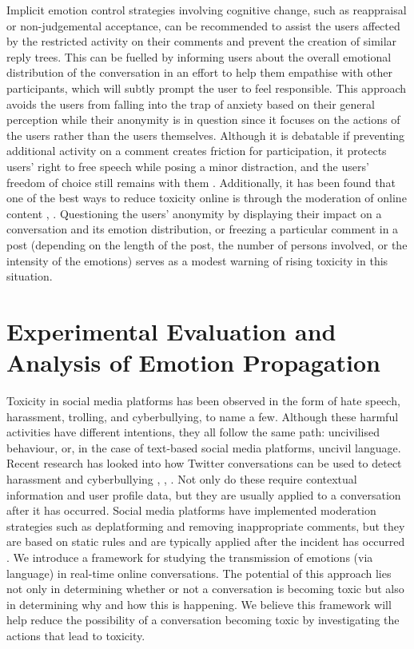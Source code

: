 \documentclass[acmtog]{acmart}
\begin{document}
Implicit emotion control strategies involving cognitive change, such as reappraisal or non-judgemental acceptance, can be recommended to assist the users affected by the restricted activity on their comments and prevent the creation of similar reply trees. This can be fuelled by informing users about the overall emotional distribution of the conversation in an effort to help them empathise with other participants, which will subtly prompt the user to feel responsible. This approach avoids the users from  falling into the trap of anxiety based on their general perception while their anonymity is in question since it focuses on the actions of the users rather than the users themselves. Although it is debatable if preventing additional activity on a comment creates friction for participation, it protects users' right to free speech while posing a minor distraction, and the users' freedom of choice still remains with them \cite{kiskola2021applying}. Additionally, it has been found that one of the best ways to reduce toxicity online is through the moderation of online content \cite{thomas2022s}, \cite{jhaver2021evaluating}. Questioning the users' anonymity by displaying their impact on a conversation and its emotion distribution, or freezing a particular comment in a post (depending on the length of the post, the number of persons involved, or the intensity of the emotions) serves as a modest warning of rising toxicity in this situation.





\section{Experimental Evaluation and Analysis of Emotion Propagation}
Toxicity in social media platforms has been observed in the form of hate speech, harassment, trolling, and cyberbullying, to name a few. Although these harmful activities have different intentions, they all follow the same path: uncivilised behaviour, or, in the case of text-based social media platforms, uncivil language. Recent research has looked into how Twitter conversations can be used to detect harassment and cyberbullying \cite{guberman2016quantifying}, \cite{georgakopoulos2019convolutional}, \cite{pavlopoulos2020toxicity}. Not only do these require contextual information and user profile data, but they are usually applied to a conversation after it has occurred. Social media platforms have implemented moderation strategies such as deplatforming and removing inappropriate comments, but they are based on static rules and are typically applied after the incident has occurred \cite{jhaver2021evaluating}. We introduce a framework for studying the transmission of emotions (via language) in real-time online conversations. The potential of this approach lies not only in determining whether or not a conversation is becoming toxic but also in determining why and how this is happening. We believe this framework will help reduce the possibility of a conversation becoming toxic by investigating the actions that lead to toxicity.
\end{document}
